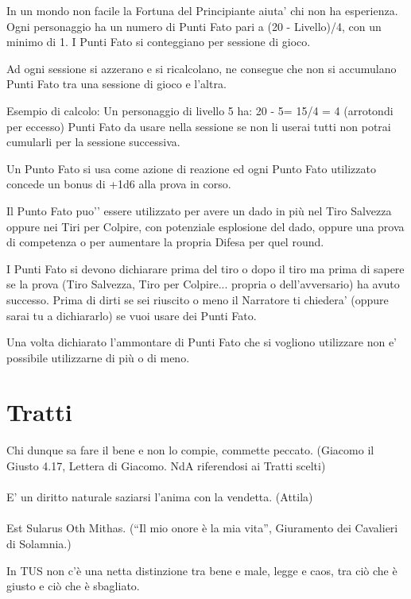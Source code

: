 \documentclass[a4paper,11pt,twoside,openany]{book}
\begin{document}
In un mondo non facile la Fortuna del Principiante aiuta’ chi non ha esperienza.
Ogni personaggio ha un numero di Punti Fato pari a (20 - Livello)/4, con un minimo di 1. I Punti Fato si conteggiano per sessione di gioco.

Ad ogni sessione si azzerano e si ricalcolano, ne consegue che non si accumulano Punti Fato tra una sessione di gioco e l’altra.

Esempio di calcolo:
Un personaggio di livello 5 ha: 20 - 5= 15/4 = 4 (arrotondi per eccesso) Punti Fato da usare nella sessione se non li userai tutti non potrai cumularli per la sessione successiva.

Un Punto Fato si usa come azione di reazione ed ogni Punto Fato utilizzato concede un bonus di +1d6 alla prova in corso.

Il Punto Fato puo'’ essere utilizzato per avere un dado in più nel Tiro Salvezza oppure nei Tiri per Colpire, con potenziale esplosione del dado, oppure una prova di competenza o per aumentare la propria Difesa per quel round.

I Punti Fato si devono dichiarare prima del tiro o dopo il tiro ma prima di sapere se la prova (Tiro Salvezza, Tiro per Colpire... propria o dell’avversario) ha avuto successo.
Prima di dirti se sei riuscito o meno il Narratore ti chiedera’ (oppure sarai tu a dichiararlo) se vuoi usare dei Punti Fato.

Una volta dichiarato l’ammontare di Punti Fato che si vogliono utilizzare non e’ possibile utilizzarne di più o di meno.

\section{Tratti}

\label{tratti}
\begin{tcolorbox}[enhanced,arc=5pt,boxrule=0.3pt]{Chi dunque sa fare il bene e non lo compie, commette peccato. (Giacomo il Giusto 4.17, Lettera di Giacomo. NdA riferendosi ai Tratti scelti)\\\\
E' un diritto naturale saziarsi l'anima con la vendetta. (Attila)\\\\
Est Sularus Oth Mithas. (“Il mio onore è la mia vita”, Giuramento dei Cavalieri di Solamnia.)}\end{tcolorbox}\medskip

In TUS non c'è una netta distinzione tra bene e male, legge e caos, tra ciò che è giusto e ciò che è sbagliato.
\end{document}
